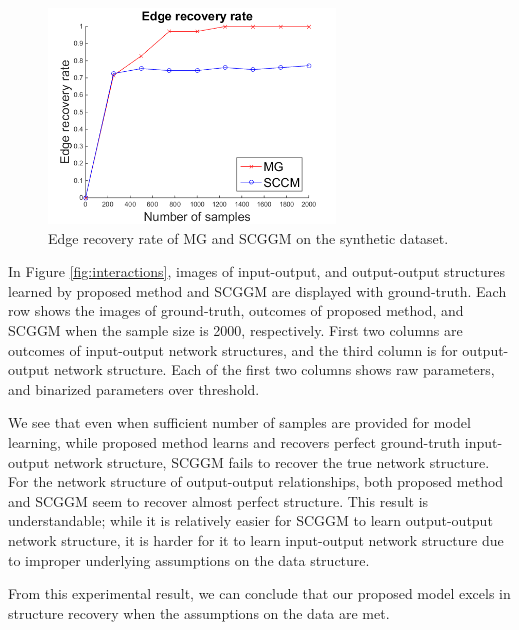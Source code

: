 \documentclass{article}
\begin{document}
\begin{figure}[h]
  \centering
  \includegraphics[width=3in]{figure/EdgeRecRate2.png}
  \caption[] {Edge recovery rate of MG and SCGGM on the synthetic dataset.\label{fig:syn_edge_rec}}
\end{figure}


In Figure \ref{fig:interactions}, images of input-output, and output-output structures learned by proposed method and SCGGM are displayed with ground-truth.
Each row shows the images of ground-truth, outcomes of proposed method, and SCGGM when the sample size is 2000, respectively.
First two columns are outcomes of input-output network structures, and the third column is for output-output network structure. 
Each of the first two columns shows raw parameters, and binarized parameters over threshold.

We see that even when sufficient number of samples are provided for model learning, while proposed method learns and recovers perfect ground-truth input-output network structure, SCGGM fails to recover the true network structure. 
For the network structure of output-output relationships, both proposed method and SCGGM seem to recover almost perfect structure.
This result is understandable; while it is relatively easier for SCGGM to learn output-output network structure, it is harder for it to learn input-output network structure  due to improper underlying assumptions on the data structure.

From this experimental result, we can conclude that our proposed model excels in structure recovery when the assumptions on the data are met.
\end{document}
